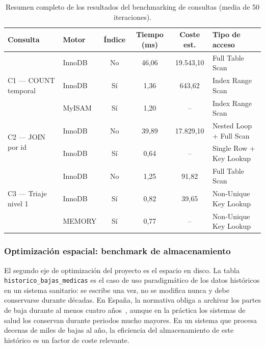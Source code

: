 \documentclass[../main.tex]{subfiles}
\begin{document}
\begin{table}[htbp]
    \centering
    \caption{Resumen completo de los resultados del benchmarking de consultas (media de 50 iteraciones).}
    \label{tab:benchmark_resumen}
    \small
    \begin{tabular}{llcccp{3.2cm}}
        \toprule
        \textbf{Consulta} & \textbf{Motor} & \textbf{Índice} & \textbf{Tiempo (ms)} & \textbf{Coste est.} & \textbf{Tipo de acceso} \\
        \midrule
        \multirow{3}{*}{C1 — COUNT temporal}
            & InnoDB  & No  & 46,06 & 19.543,10 & Full Table Scan \\
            & InnoDB  & Sí  &  1,36 &    643,62 & Index Range Scan \\
            & MyISAM  & Sí  &  1,20 &        -- & Index Range Scan \\
        \midrule
        \multirow{2}{*}{C2 — JOIN por id}
            & InnoDB  & No  & 39,89 & 17.829,10 & Nested Loop + Full Scan \\
            & InnoDB  & Sí  &  0,64 &        -- & Single Row + Key Lookup \\
        \midrule
        \multirow{3}{*}{C3 — Triaje nivel 1}
            & InnoDB  & No  &  1,25 &     91,82 & Full Table Scan \\
            & InnoDB  & Sí  &  0,82 &     39,65 & Non-Unique Key Lookup \\
            & MEMORY  & Sí  &  0,77 &        -- & Non-Unique Key Lookup \\
        \bottomrule
    \end{tabular}
\end{table}

\subsubsection{Optimización espacial: benchmark de almacenamiento}
\label{sec:benchmark_espacial}

El segundo eje de optimización del proyecto es el espacio en disco. La tabla \texttt{historico\_bajas\_medicas} es el caso de uso paradigmático de los datos históricos en un sistema sanitario: se escribe una vez, no se modifica nunca y debe conservarse durante décadas. En España, la normativa obliga a archivar los partes de baja durante al menos cuatro años~\cite{lprl1995}, aunque en la práctica los sistemas de salud los conservan durante periodos mucho mayores. En un sistema que procesa decenas de miles de bajas al año, la eficiencia del almacenamiento de este histórico es un factor de coste relevante.
\end{document}
